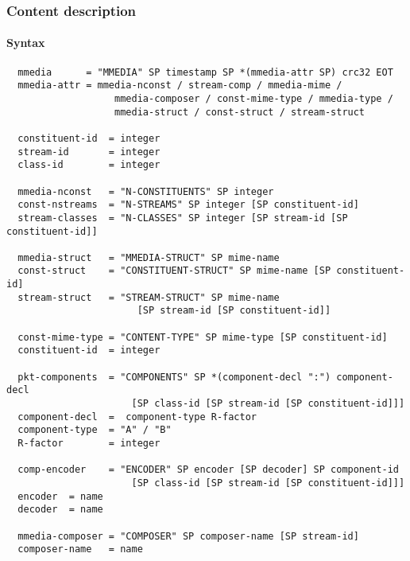 \documentclass{medusabook}
\begin{document}
\subsubsection{Content description}

\paragraph{Syntax}
\begin{verbatim}
  mmedia      = "MMEDIA" SP timestamp SP *(mmedia-attr SP) crc32 EOT
  mmedia-attr = mmedia-nconst / stream-comp / mmedia-mime /
                   mmedia-composer / const-mime-type / mmedia-type /
                   mmedia-struct / const-struct / stream-struct

  constituent-id  = integer
  stream-id       = integer
  class-id        = integer

  mmedia-nconst   = "N-CONSTITUENTS" SP integer
  const-nstreams  = "N-STREAMS" SP integer [SP constituent-id]
  stream-classes  = "N-CLASSES" SP integer [SP stream-id [SP constituent-id]]

  mmedia-struct   = "MMEDIA-STRUCT" SP mime-name
  const-struct    = "CONSTITUENT-STRUCT" SP mime-name [SP constituent-id]
  stream-struct   = "STREAM-STRUCT" SP mime-name
                       [SP stream-id [SP constituent-id]]

  const-mime-type = "CONTENT-TYPE" SP mime-type [SP constituent-id]
  constituent-id  = integer

  pkt-components  = "COMPONENTS" SP *(component-decl ":") component-decl
                      [SP class-id [SP stream-id [SP constituent-id]]]
  component-decl  =  component-type R-factor
  component-type  = "A" / "B"
  R-factor        = integer

  comp-encoder    = "ENCODER" SP encoder [SP decoder] SP component-id 
                      [SP class-id [SP stream-id [SP constituent-id]]]
  encoder  = name
  decoder  = name

  mmedia-composer = "COMPOSER" SP composer-name [SP stream-id]
  composer-name   = name
\end{verbatim}
\end{document}
